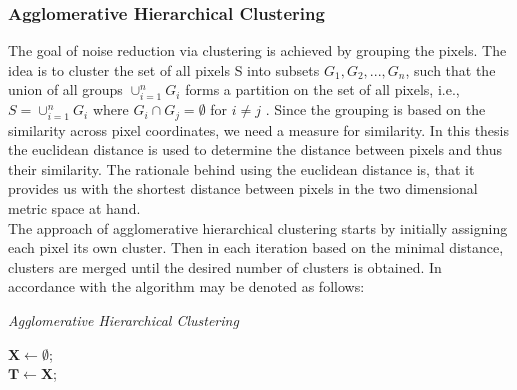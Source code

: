 \documentclass[aodsor,preprint]{imsart}
\numberwithin{equation}{section}
\theoremstyle{plain}
\begin{document}
\subsubsection{Agglomerative Hierarchical Clustering}
The goal of noise reduction via clustering is achieved by grouping the pixels. The idea is to cluster the set of all pixels S into subsets $G_1, G_2,..., G_n$, such that the union of all groups $\cup_{i = 1}^n G_i$ forms a partition on the set of all pixels, i.e., $S = \cup_{i = 1}^n G_i$ where $G_i \cap G_j = \emptyset$ for $i \neq j$ \citep{Rok09}. Since the grouping is based on the similarity across pixel coordinates, we need a measure for similarity. In this thesis the euclidean distance is used to determine the distance between pixels and thus their similarity. The rationale behind using the euclidean distance is, that it provides us with the shortest distance between pixels in the two dimensional metric space at hand.\\
The approach of agglomerative hierarchical clustering starts by initially assigning each pixel its own cluster. Then in each iteration based on the minimal distance, clusters are merged until the desired number of clusters is obtained. In accordance with \citet{RPA2018} the algorithm may be denoted as follows:


{}
\begin{algorithm}[hbt!]
	\caption{\textit{Agglomerative Hierarchical Clustering}}\label{alg:one}
	$\mathbf{X} \gets \emptyset$;\\
	$\mathbf{T} \gets \mathbf{X}$;\\
\end{algorithm}
\end{document}
